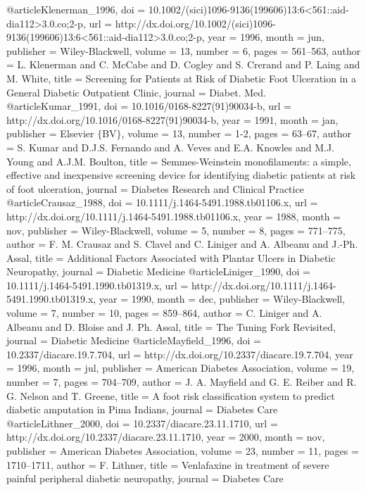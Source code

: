 @article{Klenerman_1996,
	doi = {10.1002/(sici)1096-9136(199606)13:6<561::aid-dia112>3.0.co;2-p},
	url = {http://dx.doi.org/10.1002/(sici)1096-9136(199606)13:6<561::aid-dia112>3.0.co;2-p},
	year = 1996,
	month = {jun},
	publisher = {Wiley-Blackwell},
	volume = {13},
	number = {6},
	pages = {561--563},
	author = {L. Klenerman and C. McCabe and D. Cogley and S. Crerand and P. Laing and M. White},
	title = {Screening for Patients at Risk of Diabetic Foot Ulceration in a General Diabetic Outpatient Clinic},
	journal = {Diabet. Med.}
}
@article{Kumar_1991,
	doi = {10.1016/0168-8227(91)90034-b},
	url = {http://dx.doi.org/10.1016/0168-8227(91)90034-b},
	year = 1991,
	month = {jan},
	publisher = {Elsevier $\lbrace$BV$\rbrace$},
	volume = {13},
	number = {1-2},
	pages = {63--67},
	author = {S. Kumar and D.J.S. Fernando and A. Veves and E.A. Knowles and M.J. Young and A.J.M. Boulton},
	title = {Semmes-Weinstein monofilaments: a simple, effective and inexpensive screening device for identifying diabetic patients at risk of foot ulceration},
	journal = {Diabetes Research and Clinical Practice}
}
@article{Crausaz_1988,
	doi = {10.1111/j.1464-5491.1988.tb01106.x},
	url = {http://dx.doi.org/10.1111/j.1464-5491.1988.tb01106.x},
	year = 1988,
	month = {nov},
	publisher = {Wiley-Blackwell},
	volume = {5},
	number = {8},
	pages = {771--775},
	author = {F. M. Crausaz and S. Clavel and C. Liniger and A. Albeanu and J.-Ph. Assal},
	title = {Additional Factors Associated with Plantar Ulcers in Diabetic Neuropathy},
	journal = {Diabetic Medicine}
}
@article{Liniger_1990,
	doi = {10.1111/j.1464-5491.1990.tb01319.x},
	url = {http://dx.doi.org/10.1111/j.1464-5491.1990.tb01319.x},
	year = 1990,
	month = {dec},
	publisher = {Wiley-Blackwell},
	volume = {7},
	number = {10},
	pages = {859--864},
	author = {C. Liniger and A. Albeanu and D. Bloise and J. Ph. Assal},
	title = {The Tuning Fork Revisited},
	journal = {Diabetic Medicine}
}
@article{Mayfield_1996,
	doi = {10.2337/diacare.19.7.704},
	url = {http://dx.doi.org/10.2337/diacare.19.7.704},
	year = 1996,
	month = {jul},
	publisher = {American Diabetes Association},
	volume = {19},
	number = {7},
	pages = {704--709},
	author = {J. A. Mayfield and G. E. Reiber and R. G. Nelson and T. Greene},
	title = {A foot risk classification system to predict diabetic amputation in Pima Indians},
	journal = {Diabetes Care}
}
@article{Lithner_2000,
	doi = {10.2337/diacare.23.11.1710},
	url = {http://dx.doi.org/10.2337/diacare.23.11.1710},
	year = 2000,
	month = {nov},
	publisher = {American Diabetes Association},
	volume = {23},
	number = {11},
	pages = {1710--1711},
	author = {F. Lithner},
	title = {Venlafaxine in treatment of severe painful peripheral diabetic neuropathy},
	journal = {Diabetes Care}
}
